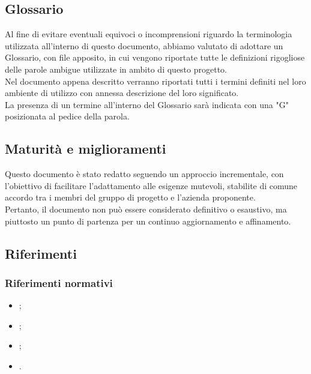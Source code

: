 \subsection{Glossario}
\label{sec:glossario}
Al fine di evitare eventuali equivoci o incomprensioni riguardo la terminologia utilizzata all’interno di questo documento, 
abbiamo valutato di adottare un Glossario, con file apposito, in cui
vengono riportate tutte le definizioni rigogliose delle parole ambigue utilizzate in ambito di
questo progetto.\\
Nel documento appena descritto verranno riportati tutti i termini definiti nel
loro ambiente di utilizzo con annessa descrizione del loro significato.\\
La presenza di un termine all'interno del Glossario sarà indicata con una "G" posizionata al pedice della parola.

\subsection{Maturità e miglioramenti}
Questo documento è stato redatto seguendo un approccio incrementale, con l'obiettivo di facilitare l'adattamento alle esigenze mutevoli, stabilite di comune accordo tra i membri del gruppo di progetto e l'azienda proponente.\\
Pertanto, il documento non può essere considerato definitivo o esaustivo, ma piuttosto un punto di partenza per un continuo aggiornamento e affinamento.

\subsection{Riferimenti}
\subsubsection{Riferimenti normativi}
\begin{itemize}
    \item {}; \\
    \item {}; \\
    \item {}; \\
    \item {}.
\end{itemize}

